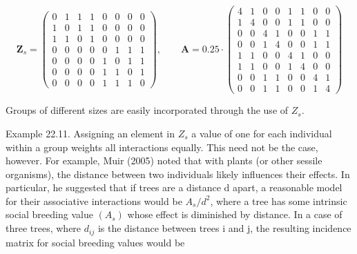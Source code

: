 \documentclass{article}
\begin{document}
\begin{equation}
\mathbf{Z}_{s}=\begin{pmatrix}{{{0}}}&{{{1}}}&{{{1}}}&{{{1}}}&{{{0}}}&{{{0}}}&{{{0}}}&{{{0}}} \\{{{1}}}&{{{0}}}&{{{1}}}&{{{1}}}&{{{0}}}&{{{0}}}&{{{0}}}&{{{0}}} \\{{{1}}}&{{{1}}}&{{{0}}}&{{{1}}}&{{{0}}}&{{{0}}}&{{{0}}}&{{{0}}} \\{{{0}}}&{{{0}}}&{{{0}}}&{{{0}}}&{{{0}}}&{{{1}}}&{{{1}}}&{{{1}}} \\{{{0}}}&{{{0}}}&{{{0}}}&{{{0}}}&{{{1}}}&{{{0}}}&{{{1}}}&{{{1}}} \\{{{0}}}&{{{0}}}&{{{0}}}&{{{0}}}&{{{1}}}&{{{1}}}&{{{0}}}&{{{1}}} \\{{{0}}}&{{{0}}}&{{{0}}}&{{{0}}}&{{{1}}}&{{{1}}}&{{{1}}}&{{{0}}}\end{pmatrix},\qquad\mathbf{A}=0.25\cdot\begin{pmatrix}{{{4}}}&{{{1}}}&{{{0}}}&{{{0}}}&{{{1}}}&{{{1}}}&{{{0}}}&{{{0}}} \\{{{1}}}&{{{4}}}&{{{0}}}&{{{0}}}&{{{1}}}&{{{1}}}&{{{0}}}&{{{0}}} \\{{{0}}}&{{{0}}}&{{{4}}}&{{{1}}}&{{{0}}}&{{{0}}}&{{{1}}}&{{{1}}} \\{{{0}}}&{{{0}}}&{{{1}}}&{{{4}}}&{{{0}}}&{{{0}}}&{{{1}}}&{{{1}}} \\{{{1}}}&{{{1}}}&{{{0}}}&{{{0}}}&{{{4}}}&{{{1}}}&{{{0}}}&{{{0}}} \\{{{1}}}&{{{1}}}&{{{0}}}&{{{0}}}&{{{1}}}&{{{4}}}&{{{0}}}&{{{0}}} \\{{{0}}}&{{{0}}}&{{{1}}}&{{{1}}}&{{{0}}}&{{{0}}}&{{{4}}}&{{{1}}} \\{{{0}}}&{{{0}}}&{{{1}}}&{{{1}}}&{{{0}}}&{{{0}}}&{{{1}}}&{{{4}}}\end{pmatrix}
\end{equation}

Groups of different sizes are easily incorporated through the use of  $ Z_{s} $.

Example 22.11. Assigning an element in  $ Z_s $ a value of one for each individual within a group weights all interactions equally. This need not be the case, however. For example, Muir (2005) noted that with plants (or other sessile organisms), the distance between two individuals likely influences their effects. In particular, he suggested that if trees are a distance d apart, a reasonable model for their associative interactions would be  $ A_s/d^2 $, where a tree has some intrinsic social breeding value  $ (A_s) $ whose effect is diminished by distance. In a case of three trees, where  $ d_{ij} $ is the distance between trees i and j, the resulting incidence matrix for social breeding values would be
\end{document}
